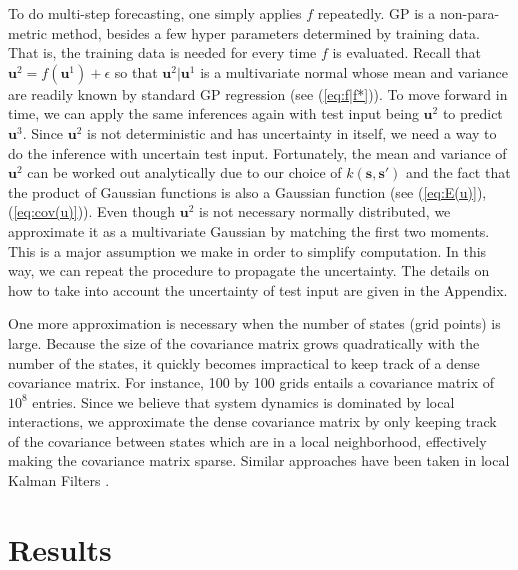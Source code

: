 \documentclass[smallextended,natbib]{svjour3}       %
\begin{document}
To do multi-step forecasting, one simply applies $f$ repeatedly. GP is a non-para-metric method, besides a few hyper parameters determined by training data. That is, the training data is needed for every time $f$ is evaluated. Recall that $\mathbf{u}^{2}=f(\mathbf{u}^{1})+\epsilon$ so that $\mathbf{u}^{2}\vert\mathbf{u}^{1}$ is a multivariate normal whose mean and variance are readily known by standard GP regression (see (\ref{eq:f|f*})). To move forward in time, we can apply the same inferences again with test input being $\mathbf{u}^{2}$ to predict $\mathbf{u}^3$. Since $\mathbf{u}^{2}$ is not deterministic and has uncertainty in itself, we need a way to do the inference with uncertain test input. Fortunately, the mean and variance of $\mathbf{u}^{2}$ can be worked out analytically due to our choice of $k(\mathbf{s},\mathbf{s}')$ and the fact that the product of Gaussian functions is also a Gaussian function (see (\ref{eq:E(u)}), (\ref{eq:cov(u)})). Even though $\mathbf{u}^{2}$ is not necessary normally distributed, we approximate it as a multivariate Gaussian by matching the first two moments. This is a major assumption we make in order to simplify computation. In this way, we can repeat the procedure to propagate the uncertainty. The details on how to take into account the uncertainty of test input are given in the Appendix.

One more approximation is necessary when the number of states (grid points) is large. Because the size of the covariance matrix grows quadratically with the number of the states, it quickly becomes impractical to keep track of a dense covariance matrix. For instance, 100 by 100 grids entails a covariance matrix of $10^{8}$ entries. Since we believe that system dynamics is dominated by local interactions, we approximate the dense covariance matrix by only keeping track of the covariance between states which are in a local neighborhood, effectively making the covariance matrix sparse. Similar approaches have been taken in local Kalman Filters \citep{Hunt2007}.


\section{Results} \label{sec:syn-data}
\end{document}

